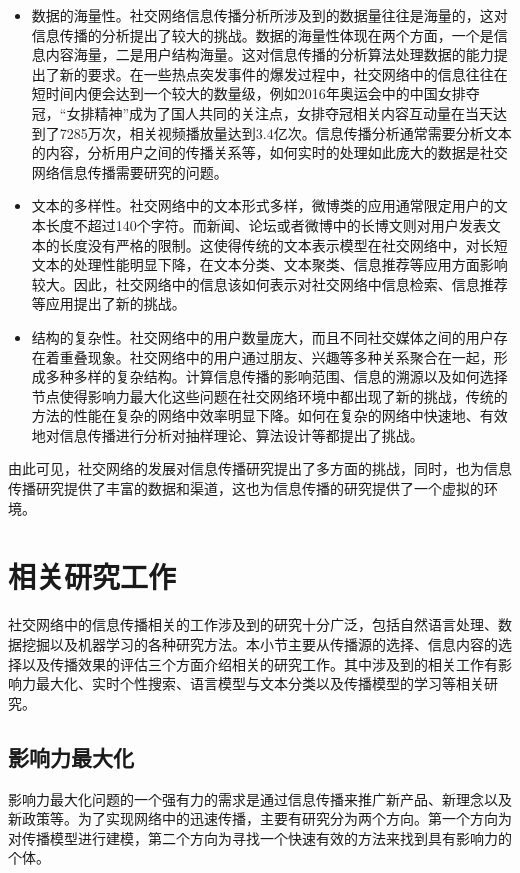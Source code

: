 \begin{itemize}
	\item 数据的海量性。社交网络信息传播分析所涉及到的数据量往往是海量的，这对信息传播的分析提出了较大的挑战。数据的海量性体现在两个方面，一个是信息内容海量，二是用户结构海量。这对信息传播的分析算法处理数据的能力提出了新的要求。在一些热点突发事件的爆发过程中，社交网络中的信息往往在短时间内便会达到一个较大的数量级，例如2016年奥运会中的中国女排夺冠，“女排精神”成为了国人共同的关注点，女排夺冠相关内容互动量在当天达到了7285万次，相关视频播放量达到3.4亿次。信息传播分析通常需要分析文本的内容，分析用户之间的传播关系等，如何实时的处理如此庞大的数据是社交网络信息传播需要研究的问题。
	\item 文本的多样性。社交网络中的文本形式多样，微博类的应用通常限定用户的文本长度不超过140个字符。而新闻、论坛或者微博中的长博文则对用户发表文本的长度没有严格的限制。这使得传统的文本表示模型在社交网络中，对长短文本的处理性能明显下降，在文本分类、文本聚类、信息推荐等应用方面影响较大。因此，社交网络中的信息该如何表示对社交网络中信息检索、信息推荐等应用提出了新的挑战。
	\item 结构的复杂性。社交网络中的用户数量庞大，而且不同社交媒体之间的用户存在着重叠现象。社交网络中的用户通过朋友、兴趣等多种关系聚合在一起，形成多种多样的复杂结构。计算信息传播的影响范围、信息的溯源以及如何选择节点使得影响力最大化这些问题在社交网络环境中都出现了新的挑战，传统的方法的性能在复杂的网络中效率明显下降。如何在复杂的网络中快速地、有效地对信息传播进行分析对抽样理论、算法设计等都提出了挑战。
\end{itemize}

由此可见，社交网络的发展对信息传播研究提出了多方面的挑战，同时，也为信息传播研究提供了丰富的数据和渠道，这也为信息传播的研究提供了一个虚拟的环境。

\section{相关研究工作}
\label{sec1:relatedWorks}
社交网络中的信息传播相关的工作涉及到的研究十分广泛，包括自然语言处理、数据挖掘以及机器学习的各种研究方法。本小节主要从传播源的选择、信息内容的选择以及传播效果的评估三个方面介绍相关的研究工作。其中涉及到的相关工作有影响力最大化、实时个性搜索、语言模型与文本分类以及传播模型的学习等相关研究。
\subsection{影响力最大化}
\label{subsec1:influenceMax}
影响力最大化问题的一个强有力的需求是通过信息传播来推广新产品、新理念以及新政策等。为了实现网络中的迅速传播，主要有研究分为两个方向。第一个方向为对传播模型进行建模，第二个方向为寻找一个快速有效的方法来找到具有影响力的个体。

